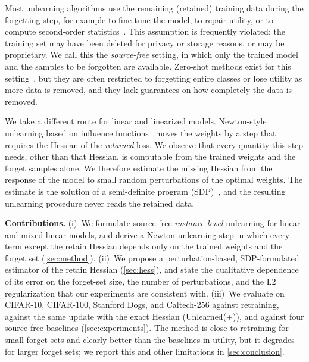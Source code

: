\documentclass[10pt,twocolumn,letterpaper]{article}
\begin{document}
Most unlearning algorithms use the remaining (retained) training data during the forgetting step, for example to fine-tune the model, to repair utility, or to compute second-order statistics~\cite{golatkar2020eternal,guo2020certified,sekhari2021remember,mehta2022deep,kurmanji2023towards}. This assumption is frequently violated: the training set may have been deleted for privacy or storage reasons, or may be proprietary. We call this the \emph{source-free} setting, in which only the trained model and the samples to be forgotten are available. Zero-shot methods exist for this setting~\cite{chundawat2023zero,foster2024information,cha2024learning}, but they are often restricted to forgetting entire classes or lose utility as more data is removed, and they lack guarantees on how completely the data is removed.

We take a different route for linear and linearized models. Newton-style unlearning based on influence functions~\cite{koh2017understanding,guo2020certified} moves the weights by a step that requires the Hessian of the \emph{retained} loss. We observe that every quantity this step needs, other than that Hessian, is computable from the trained weights and the forget samples alone. We therefore estimate the missing Hessian from the response of the model to small random perturbations of the optimal weights. The estimate is the solution of a semi-definite program (SDP)~\cite{boyd2004convex}, and the resulting unlearning procedure never reads the retained data.

\noindent\textbf{Contributions.} (i)~We formulate source-free \emph{instance-level} unlearning for linear and mixed linear models, and derive a Newton unlearning step in which every term except the retain Hessian depends only on the trained weights and the forget set (\cref{sec:method}). (ii)~We propose a perturbation-based, SDP-formulated estimator of the retain Hessian (\cref{sec:hess}), and state the qualitative dependence of its error on the forget-set size, the number of perturbations, and the L2 regularization that our experiments are consistent with. (iii)~We evaluate on CIFAR-10, CIFAR-100, Stanford Dogs, and Caltech-256 against retraining, against the same update with the exact Hessian (Unlearned(+)), and against four source-free baselines (\cref{sec:experiments}). The method is close to retraining for small forget sets and clearly better than the baselines in utility, but it degrades for larger forget sets; we report this and other limitations in \cref{sec:conclusion}.
\end{document}
